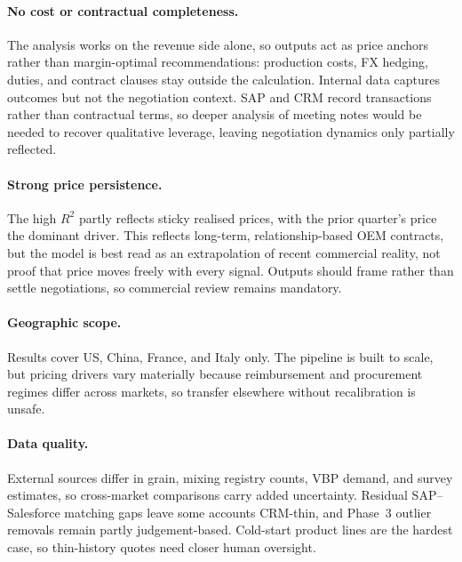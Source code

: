 \documentclass{article}
\begin{document}
\paragraph{No cost or contractual completeness.}
The analysis works on the revenue side alone, so outputs act as price anchors rather than margin-optimal recommendations: production costs, FX hedging, duties, and contract clauses stay outside the calculation. Internal data captures outcomes but not the negotiation context. SAP and CRM record transactions rather than contractual terms, so deeper analysis of meeting notes would be needed to recover qualitative leverage, leaving negotiation dynamics only partially reflected.
\vspace{0.4em}

\paragraph{Strong price persistence.}
The high $R^2$ partly reflects sticky realised prices, with the prior quarter's price the dominant driver. This reflects long-term, relationship-based OEM contracts, but the model is best read as an extrapolation of recent commercial reality, not proof that price moves freely with every signal. Outputs should frame rather than settle negotiations, so commercial review remains mandatory.
\vspace{0.4em}

\paragraph{Geographic scope.}
Results cover US, China, France, and Italy only. The pipeline is built to scale, but pricing drivers vary materially because reimbursement and procurement regimes differ across markets, so transfer elsewhere without recalibration is unsafe.
\vspace{0.4em}

\paragraph{Data quality.}
External sources differ in grain, mixing registry counts, VBP demand, and survey estimates, so cross-market comparisons carry added uncertainty. Residual SAP--Salesforce matching gaps leave some accounts CRM-thin, and Phase~3 outlier removals remain partly judgement-based. Cold-start product lines are the hardest case, so thin-history quotes need closer human oversight.
\end{document}
